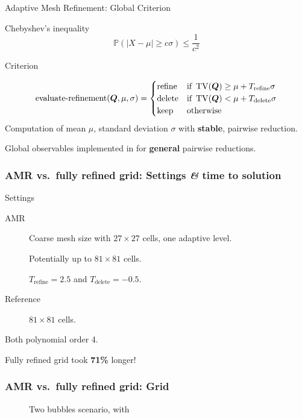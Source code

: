 \documentclass[aspectratio=169]{beamer}
\begin{document}
\begin{frame}{Adaptive Mesh Refinement: Global Criterion}
  \begin{block}{Chebyshev's inequality}
\begin{equation}
  \label{eq:chebychev}
  \mathbb{P}(\vert X - \mu \vert \geq c \sigma) \leq \frac{1}{c^2}
\end{equation}
\end{block}
  
\begin{block}{Criterion}
  
\begin{equation}
  \label{eq:refinement-criterion}
  \operatorname{evaluate-refinement}(\bm{Q}, \mu, \sigma) =
  \begin{cases}
    \text{refine} & \text{if } \operatorname{TV}(\bm{Q}) \geq \mu + T_\text{refine} \sigma \\
    \text{delete} & \text{if } \operatorname{TV}(\bm{Q}) < \mu + T_\text{delete} \sigma \\
    \text{keep} & \text{otherwise}
    \end{cases}
\end{equation}
Computation of mean $\mu$, standard deviation $\sigma$ with \textbf{stable}, pairwise reduction.

Global observables implemented in \exahype{} for \textbf{general} pairwise reductions.
\end{block}
\end{frame}  

\begin{frame}
  \frametitle{AMR vs.\ fully refined grid: Settings \textit{\&} time
    to solution}
  \begin{block}{Settings}
    \begin{description}
    \item[AMR] Coarse mesh size with $27 \times 27$ cells, one adaptive level.

      Potentially up to $81 \times 81$ cells.

      $T_\text{refine} = 2.5$ and $T_\text{delete} = -0.5$.
    \item[Reference] $81 \times 81$ cells.
    \end{description}
  \end{block}
  Both polynomial order 4.

  Fully refined grid took \textbf{71\%} longer!
\end{frame}


\begin{frame}
  \frametitle{AMR vs.\ fully refined grid: Grid}
   \begin{figure}[h]
    \centering
    \caption{Two bubbles scenario, with \amr{}}
  \end{figure}
\end{frame}
\end{document}
